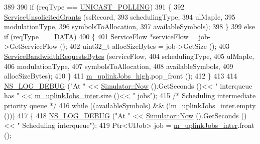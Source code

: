 \begin{DoxyCode}
389 
390       \textcolor{keywordflow}{if} (reqType == \hyperlink{namespacens3_a534f9a14e4d9aeb5b400e61f152a73a2ab774c9fb3410eec7ee3c8367c50ccbb3}{UNICAST\_POLLING})
391         \{
392           \hyperlink{classns3_1_1UplinkSchedulerMBQoS_a3cbff7d3b7d31739806421f0eb2b1cc6}{ServiceUnsolicitedGrants} (ssRecord,
393                                     schedulingType,
394                                     ulMapIe,
395                                     modulationType,
396                                     symbolsToAllocation,
397                                     availableSymbols);
398         \}
399       \textcolor{keywordflow}{else} \textcolor{keywordflow}{if} (reqType == \hyperlink{namespacens3_a534f9a14e4d9aeb5b400e61f152a73a2ae87e0f8f47d5619e16355b1f8caca558}{DATA})
400         \{
401           ServiceFlow *serviceFlow = job->GetServiceFlow ();
402           uint32\_t allocSizeBytes = job->GetSize ();
403           \hyperlink{classns3_1_1UplinkSchedulerMBQoS_a9880f5e1bce7b93ddff11623f29d4865}{ServiceBandwidthRequestsBytes} (serviceFlow,
404                                          schedulingType,
405                                          ulMapIe,
406                                          modulationType,
407                                          symbolsToAllocation,
408                                          availableSymbols,
409                                          allocSizeBytes);
410         \}
411       \hyperlink{classns3_1_1UplinkSchedulerMBQoS_acb8b5539e366b4942381b08edccfba4b}{m\_uplinkJobs\_high}.pop\_front ();
412     \}
413 
414   \hyperlink{group__logging_ga413f1886406d49f59a6a0a89b77b4d0a}{NS\_LOG\_DEBUG} (\textcolor{stringliteral}{"At "} << \hyperlink{classns3_1_1Simulator_ac3178fa975b419f7875e7105be122800}{Simulator::Now} ().GetSeconds ()<< \textcolor{stringliteral}{" interqueue has "} << 
      \hyperlink{classns3_1_1UplinkSchedulerMBQoS_a70eef7c9cb6dad5e71a2105e07d1ec69}{m\_uplinkJobs\_inter}.size ()<< \textcolor{stringliteral}{" jobs"});
415   \textcolor{comment}{/* Scheduling intermediate priority queue */}
416   \textcolor{keywordflow}{while} ((availableSymbols) && (!\hyperlink{classns3_1_1UplinkSchedulerMBQoS_a70eef7c9cb6dad5e71a2105e07d1ec69}{m\_uplinkJobs\_inter}.empty ()))
417     \{
418       \hyperlink{group__logging_ga413f1886406d49f59a6a0a89b77b4d0a}{NS\_LOG\_DEBUG} (\textcolor{stringliteral}{"At "} << \hyperlink{classns3_1_1Simulator_ac3178fa975b419f7875e7105be122800}{Simulator::Now} ().GetSeconds ()<< \textcolor{stringliteral}{" Scheduling
       interqueue"});
419       Ptr<UlJob> job = \hyperlink{classns3_1_1UplinkSchedulerMBQoS_a70eef7c9cb6dad5e71a2105e07d1ec69}{m\_uplinkJobs\_inter}.front ();

\end{DoxyCode}
